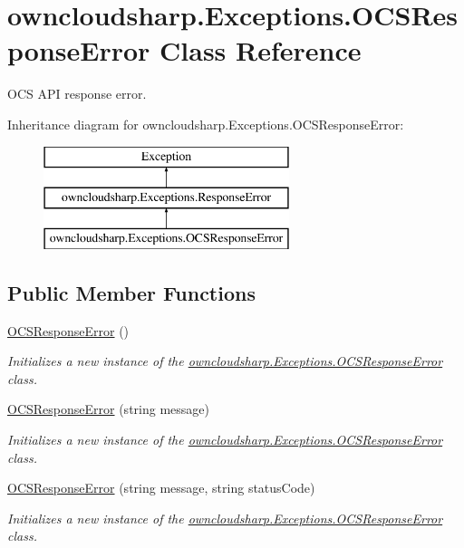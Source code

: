 \hypertarget{classowncloudsharp_1_1_exceptions_1_1_o_c_s_response_error}{}\section{owncloudsharp.\+Exceptions.\+O\+C\+S\+Response\+Error Class Reference}
\label{classowncloudsharp_1_1_exceptions_1_1_o_c_s_response_error}


O\+C\+S A\+P\+I response error.  


Inheritance diagram for owncloudsharp.\+Exceptions.\+O\+C\+S\+Response\+Error\+:\begin{figure}[H]
\begin{center}
\leavevmode
\includegraphics[height=3.000000cm]{classowncloudsharp_1_1_exceptions_1_1_o_c_s_response_error}
\end{center}
\end{figure}
\subsection*{Public Member Functions}
\begin{DoxyCompactItemize}
\item 
\hyperlink{classowncloudsharp_1_1_exceptions_1_1_o_c_s_response_error_a4a8be342eabdb1ff56309de41bb27376}{O\+C\+S\+Response\+Error} ()
\begin{DoxyCompactList}\small\item\em Initializes a new instance of the \hyperlink{classowncloudsharp_1_1_exceptions_1_1_o_c_s_response_error}{owncloudsharp.\+Exceptions.\+O\+C\+S\+Response\+Error} class. \end{DoxyCompactList}\item 
\hyperlink{classowncloudsharp_1_1_exceptions_1_1_o_c_s_response_error_abe1faed2e2f100a1d5e5c051413be70a}{O\+C\+S\+Response\+Error} (string message)
\begin{DoxyCompactList}\small\item\em Initializes a new instance of the \hyperlink{classowncloudsharp_1_1_exceptions_1_1_o_c_s_response_error}{owncloudsharp.\+Exceptions.\+O\+C\+S\+Response\+Error} class. \end{DoxyCompactList}\item 
\hyperlink{classowncloudsharp_1_1_exceptions_1_1_o_c_s_response_error_a140bbc4910589e73d076ba7a977b9e88}{O\+C\+S\+Response\+Error} (string message, string status\+Code)
\begin{DoxyCompactList}\small\item\em Initializes a new instance of the \hyperlink{classowncloudsharp_1_1_exceptions_1_1_o_c_s_response_error}{owncloudsharp.\+Exceptions.\+O\+C\+S\+Response\+Error} class. \end{DoxyCompactList}\end{DoxyCompactItemize}
